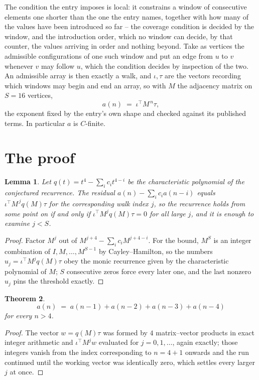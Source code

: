 \documentclass[11pt,a4paper]{article}
\theoremstyle{plain}
\newtheorem{theorem}{Theorem}
\newtheorem{lemma}[theorem]{Lemma}
\theoremstyle{definition}
\begin{document}
The condition the entry imposes is local: it constrains a window of consecutive elements one shorter than the one the entry names, together with how many of the values have been introduced so far -- the coverage condition is decided by the window, and the introduction order, which no window can decide, by that counter, the values arriving in order and nothing beyond. Take as vertices the admissible configurations of one such window and put an edge from $u$ to $v$ whenever $v$ may follow $u$, which the condition decides by inspection of the two.
An admissible array is then exactly a walk, and $\iota,\tau$ are the vectors recording which windows may begin and end an array, so with $M$ the adjacency matrix on $S=16$ vertices,
\[
a(n)\;=\;\iota^{\!\top}M^{\,n}\tau ,
\]
the exponent fixed by the entry's own shape and checked against its published terms. In
particular $a$ is $C$-finite.

\section{The proof}

\begin{lemma}\label{lem:crit}
Let $q(t)=t^{4}-\sum_i c_it^{4-i}$ be the characteristic polynomial of the
conjectured recurrence. The residual $a(n)-\sum_ic_ia(n-i)$ equals
$\iota^{\!\top}M^{\,j}q(M)\tau$ for the corresponding walk index $j$, so the recurrence
holds from some point on if and only if $\iota^{\!\top}M^{j}q(M)\tau=0$ for all large $j$,
and it is enough to examine $j<S$.
\end{lemma}

\begin{proof}
Factor $M^{j}$ out of $M^{j+4}-\sum_ic_iM^{j+4-i}$. For the bound, $M^{S}$
is an integer combination of $I,M,\dots,M^{S-1}$ by Cayley--Hamilton, so the numbers
$u_j=\iota^{\!\top}M^{j}q(M)\tau$ obey the monic recurrence given by the characteristic
polynomial of $M$; $S$ consecutive zeros force every later one, and the last nonzero $u_j$
pins the threshold exactly.
\end{proof}

\begin{theorem}
\[
a(n)\;=\;a(n-1) + a(n-2) + a(n-3) + a(n-4)
\]
for every $n>4$.
\end{theorem}

\begin{proof}
The vector $w=q(M)\tau$ was formed by $4$ matrix--vector products in exact integer
arithmetic and $\iota^{\!\top}M^{j}w$ evaluated for $j=0,1,\dots$, again exactly; those
integers vanish from the index corresponding to $n=4+1$ onwards and the run continued
until the working vector was identically zero, which settles every larger $j$ at once.
\end{proof}
\end{document}
